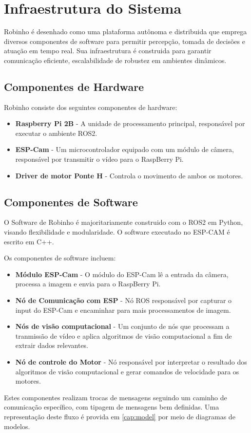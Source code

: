 \chapter{Infraestrutura do Sistema}
\label{cap:infra}
Robinho é desenhado como uma plataforma autônoma e distribuida que emprega diversos componentes de software para permitir percepção, tomada de decisões e atuação em tempo real. Sua infraestrutura é construida para garantir comunicação eficiente, escalabilidade de robustez em ambientes dinâmicos.

\section{Componentes de Hardware}
Robinho consiste dos seguintes componentes de hardware: 
\begin{itemize}
    \item \textbf{Raspberry Pi 2B} - A unidade de processamento principal, responsável por executar o ambiente ROS2.
    \item \textbf{ESP-Cam} - Um microcontrolador equipado com um módulo de câmera, responsável por transmitir o vídeo para o RaspBerry Pi.
    \item \textbf{Driver de motor Ponte H} - Controla o movimento de ambos os motores.
\end{itemize}

\section{Componentes de Software}
O Software de Robinho é majoritariamente construido com o ROS2 em Python, visando flexibilidade e modularidade. O software executado no ESP-CAM é escrito em C++.

Os componentes de software incluem:
\begin{itemize}
    \item \textbf{Módulo ESP-Cam} - O módulo do ESP-Cam lê a entrada da câmera, processa a imagem e envia para o RaspBerry Pi.
    \item \textbf{Nó de Comunicação com ESP} - Nó ROS responsável por capturar o input do ESP-Cam e encaminhar para mais processamentos de imagem.
    \item \textbf{Nós de visão computacional} - Um conjunto de nós que processam a tranmissão de vídeo e aplica algoritmos de visão computacional a fim de extrair dados relevantes.
    \item \textbf{Nó de controle do Motor} - Nó responsável por interpretar o resultado dos algoritmos de visão computacional e gerar comandos de velocidade para os motores.
\end{itemize}
Estes componentes realizam trocas de mensagens seguindo um caminho de comunicação específico, com tipagem de mensagens bem definidas. Uma representação deste fluxo é provida em \ref{cap:model} por meio de diagramas de modelos.


